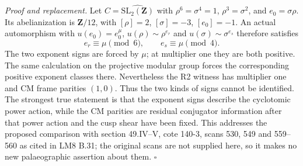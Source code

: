 \emph{Proof and replacement.}
Let $C=\widehat{\mathrm{SL}_2(\mathbf Z)}$ with
$\rho^6=\sigma^4=1$, $\rho^3=\sigma^2$, and $e_0=\sigma\rho$.
Its abelianization is $\mathbf Z/12$, with $[\rho]=2$,
$[\sigma]=-3$, $[e_0]=-1$. An actual automorphism with
$u(e_0)=e_0^\mu$, $u(\rho)\sim\rho^{e_r}$ and
$u(\sigma)\sim\sigma^{e_s}$ therefore satisfies
\[
              e_r\equiv\mu\pmod6,\qquad
              e_s\equiv\mu\pmod4.
\]
The two exponent signs are forced by $\mu$; at multiplier one
they are both positive. The same calculation on the projective
modular group forces the corresponding positive exponent
classes there. Nevertheless the R2 witness has multiplier one
and CM frame parities $(1,0)$. Thus the two kinds of signs
cannot be identified. The strongest true statement is that
the exponent signs describe the cyclotomic power action,
while the CM parities are residual conjugator information
after that power action and the cusp shear have been fixed.
This addresses the proposed comparison with section 49.IV--V,
cote 140-3, scans 530, 549 and 559--560 as cited in LM8 B.31;
the original scans are not supplied here, so it makes no new
palaeographic assertion about them. \hfill$\square$
